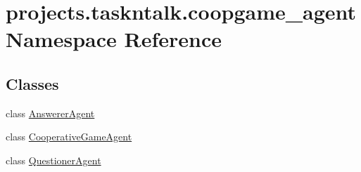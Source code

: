 \hypertarget{namespaceprojects_1_1taskntalk_1_1coopgame__agent}{}\section{projects.\+taskntalk.\+coopgame\+\_\+agent Namespace Reference}
\label{namespaceprojects_1_1taskntalk_1_1coopgame__agent}
\subsection*{Classes}
\begin{DoxyCompactItemize}
\item 
class \hyperlink{classprojects_1_1taskntalk_1_1coopgame__agent_1_1AnswererAgent}{Answerer\+Agent}
\item 
class \hyperlink{classprojects_1_1taskntalk_1_1coopgame__agent_1_1CooperativeGameAgent}{Cooperative\+Game\+Agent}
\item 
class \hyperlink{classprojects_1_1taskntalk_1_1coopgame__agent_1_1QuestionerAgent}{Questioner\+Agent}
\end{DoxyCompactItemize}
